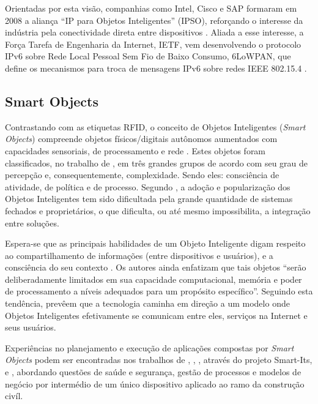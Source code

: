 \documentclass[twoside,english,brazilian]{UNISINOSmonografia}
\begin{document}
	Orientadas por esta visão, companhias como Intel, Cisco e SAP formaram em 
	2008 a aliança ``IP para Objetos Inteligentes'' (IPSO), reforçando o 
	interesse da indústria pela conectividade direta entre dispositivos 
	\cite{Dunkels2008, Mattern2010a}. 
	Aliada a esse interesse, a Força Tarefa de Engenharia da Internet, IETF, 
	vem desenvolvendo o protocolo IPv6 sobre Rede Local Pessoal Sem Fio de 
	Baixo Consumo, 6LoWPAN, que define os mecanismos para troca de mensagens 
	IPv6 sobre redes IEEE 802.15.4 \cite{Gomez2010}.

\subsection{Smart Objects}
	Contrastando com as etiquetas RFID, o conceito de Objetos Inteligentes 
	(\textit{Smart Objects}) compreende objetos físicos/digitais autônomos 
	aumentados com capacidades sensoriais, de processamento e rede 
	\cite{Gellersen2001}.
	Estes objetos foram classificados, no trabalho de , em 
	três grandes grupos de acordo com seu grau de percepção e, 
	consequentemente, complexidade. Sendo eles: consciência de atividade, de 
	política e de processo.
	Segundo , a adoção e popularização dos Objetos 
	Inteligentes tem sido dificultada pela grande quantidade de sistemas 
	fechados e proprietários, o que dificulta, ou até mesmo impossibilita, a 
	integração entre soluções. 
	
	Espera-se que as principais habilidades de um Objeto Inteligente digam 
	respeito ao compartilhamento de informações (entre dispositivos e 
	usuários), e a consciência do seu contexto \cite{Gellersen2001}. 
	Os autores ainda enfatizam que tais objetos ``serão deliberadamente 
	limitados em sua capacidade computacional, memória e poder de 
	processamento a níveis adequados para um propósito específico''. 
	Seguindo esta tendência,  prevêem que a tecnologia 
	caminha em direção a um modelo onde Objetos Inteligentes efetivamente se 
	comunicam entre eles, serviços na Internet e seus usuários.
	
	Experiências no planejamento e execução de aplicações compostas por 
	\textit{Smart Objects} podem ser encontradas nos trabalhos de 
	, , 
	, através do projeto Smart-Its, e 
	, abordando questões de saúde e segurança, gestão 
	de processos e modelos de negócio por intermédio de um único dispositivo 
	aplicado ao ramo da construção civíl.
\end{document}
